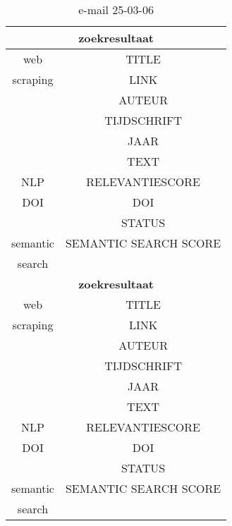\begin{table}[h!]
    \caption{e-mail 25-03-06}
    \centering
    \begin{tabular}{|c|c|} 
        \hline
        \multicolumn{2}{|c|}{\textbf{zoekresultaat}} \\
        \hline
        web &TITLE\\
        scraping&LINK\\
        &AUTEUR\\
        &TIJDSCHRIFT\\
        &JAAR\\
        &TEXT\\
        \hline
        NLP&RELEVANTIESCORE\\
        \hline
        DOI&DOI\\
        &STATUS\\
        \hline
        semantic&SEMANTIC SEARCH SCORE\\
        search&\\
        \hline
        \multicolumn{2}{|c|}{\textbf{zoekresultaat}} \\
        \hline
        web &TITLE\\
        scraping&LINK\\
        &AUTEUR\\
        &TIJDSCHRIFT\\
        &JAAR\\
        &TEXT\\
        \hline
        NLP&RELEVANTIESCORE\\
        \hline
        DOI&DOI\\
        &STATUS\\
        \hline
        semantic&SEMANTIC SEARCH SCORE\\
        search&\\
        \hline
    \end{tabular}
    \label{table:email20250306}
\end{table}
